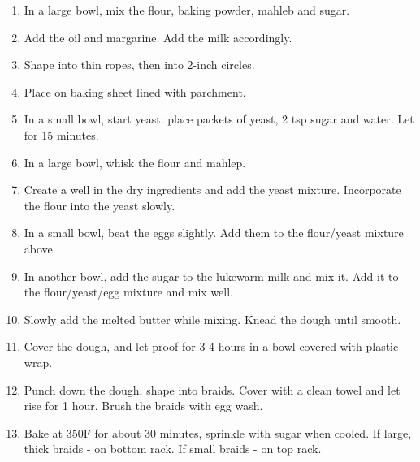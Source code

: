 \begin{enumerate}
    \item In a large bowl, mix the flour, baking powder, mahleb and sugar.
    \item Add the oil and margarine. Add the milk accordingly.
    \item Shape into thin ropes, then into 2-inch circles.
    \item Place on baking sheet lined with parchment.
    \item In a small bowl, start yeast: place packets of yeast, 2 tsp sugar and water. Let for 15 minutes.
    \item In a large bowl, whisk the flour and mahlep.
    \item Create a well in the dry ingredients and add the yeast mixture. Incorporate the flour into the yeast slowly.
    \item In a small bowl, beat the eggs slightly. Add them to the flour/yeast mixture above.
    \item In another bowl, add the sugar to the lukewarm milk and mix it. Add it to the flour/yeast/egg mixture and mix well.
    \item Slowly add the melted butter while mixing. Knead the dough until smooth.
    \item Cover the dough, and let proof for 3-4 hours in a bowl covered with plastic wrap.
    \item Punch down the dough, shape into braids. Cover with a clean towel and let rise for 1 hour. Brush the braids with egg wash.
    \item Bake at 350\degree F for about 30 minutes, sprinkle with sugar when cooled.
    If large, thick braids - on bottom rack.
    If small braids - on top rack.
\end{enumerate}
